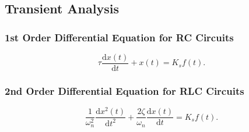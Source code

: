 \begin{symbols}
\end{symbols}

\subsection{Transient Analysis}

\subsubsection{1st Order Differential Equation for RC Circuits}
\begin{equation*}
  \tau \frac{\mathrm{d}x(t)}{\mathrm{d}t} + x(t) = K_s f(t)
.\end{equation*}

\begin{symbols}
\end{symbols}

\subsubsection{2nd Order Differential Equation for RLC Circuits}
\begin{equation*}
  \frac{1}{\omega_n^2} \frac{\mathrm{d}x^2(t)}{\mathrm{d}t^2} + \frac{2 \zeta}{\omega_n } \frac{\mathrm{d}x(t)}{\mathrm{d}t} = K_s f(t)
.\end{equation*}

\begin{symbols}
\end{symbols}
